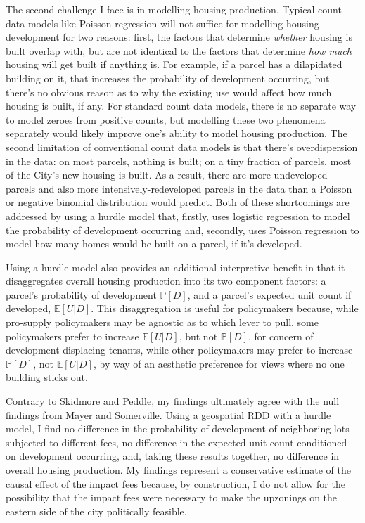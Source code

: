 \documentclass[a4paper,12pt]{article}
\begin{document}
The second challenge I face is in modelling housing production.  Typical count data models like Poisson regression will not suffice for modelling housing development for two reasons: first, the factors that determine \textit{whether} housing is built overlap with, but are not identical to the factors that determine \textit{how much} housing will get built if anything is. For example, if a parcel has a dilapidated building on it, that increases the probability of development occurring, but there's no obvious reason as to why the existing use would affect how much housing is built, if any. For standard count data models, there is no separate way to model zeroes from positive counts, but modelling these two phenomena separately would likely improve one's ability to model housing production. The second limitation of conventional count data models is that there's overdispersion in the data: on most parcels, nothing is built; on a tiny fraction of parcels, most of the City's new housing is built. As a result, there are more undeveloped parcels and also more intensively-redeveloped parcels in the data than a Poisson or negative binomial distribution would predict. Both of these shortcomings are addressed by using a hurdle model that, firstly, uses logistic regression to model the probability of development occurring and, secondly, uses Poisson regression to model how many homes would be built on a parcel, if it's developed. 

Using a hurdle model also provides an additional interpretive benefit in that it disaggregates overall housing production into its two component factors: a parcel's probability of development $\mathbb{P}[D]$, and a parcel's expected unit count if developed, $\mathbb{E}[U|D]$. This disaggregation is useful for policymakers because, while pro-supply policymakers may be agnostic as to which lever to pull, some policymakers prefer to increase $\mathbb{E}[U|D]$, but not $\mathbb{P}[D]$, for concern of development displacing tenants, while other policymakers may prefer to increase $\mathbb{P}[D]$, not $\mathbb{E}[U|D]$, by way of an aesthetic preference for views where no one building sticks out. 

Contrary to Skidmore and Peddle, my findings ultimately agree with the null findings from Mayer and Somerville. Using a geospatial RDD with a hurdle model, I find no difference in the probability of development of neighboring lots subjected to different fees, no difference in the expected unit count conditioned on development occurring, and, taking these results together, no difference in overall housing production. My findings represent a conservative estimate of the causal effect of the impact fees because, by construction, I do not allow for the possibility that the impact fees were necessary to make the upzonings on the eastern side of the city politically feasible.
\end{document}

